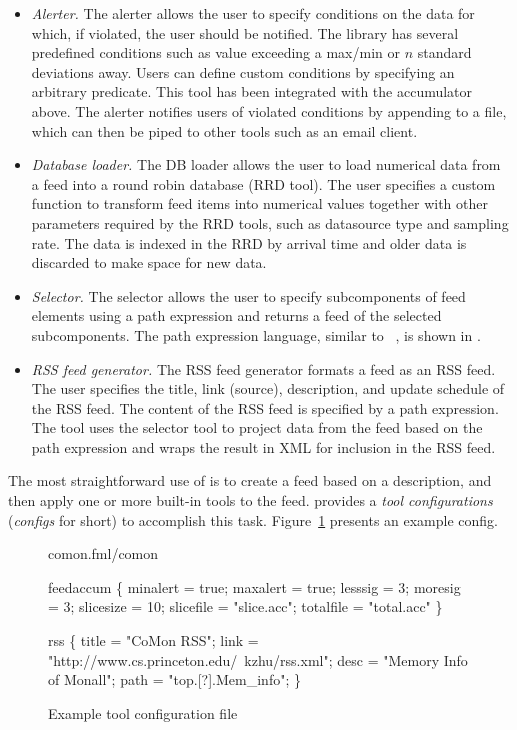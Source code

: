 \begin{itemize}
\item {\em Alerter.} The alerter allows the user to specify conditions on the data for which, if violated, the user should be notified. The library has several predefined conditions such as value exceeding a max/min or  $n$ standard deviations away. 
Users can define custom conditions by specifying an arbitrary \ocaml{} predicate. 
This tool has been integrated with the accumulator above. The alerter notifies users of violated conditions by
appending to a file, which can then be piped to other tools such as an email
client.

\item {\em Database loader.} The DB loader allows the user to load numerical
data from a feed into a round robin database (RRD tool). The user specifies
a custom function to transform feed items into numerical values together with other parameters required by the RRD tools, such as datasource
type and sampling rate. The data is indexed in the RRD by arrival time and
older data is discarded to make space for new data.

\item {\em Selector.} The selector allows the user to specify subcomponents of feed elements using a path expression and returns a feed of the selected subcomponents. The path expression language, similar to \xpath{}~\cite{xpath}, is shown in .

\item {\em RSS feed generator.} The RSS feed generator formats a
\padsd{} feed as an RSS feed. The user specifies
the title, link (source), description, and update schedule of the RSS feed.
The content of the RSS feed is specified by a path expression. The tool uses the selector tool to
project data from the feed based on the path expression and wraps the result in XML for inclusion in the RSS feed.
\end{itemize}

The most straightforward use of \padsd{} is to create a feed 
based on a \padsd{} description, and then apply one or more built-in tools 
to the feed. \padsd{} provides a {\it tool configurations} ({\it configs} for short) to accomplish this task. 
Figure~\ref{fig:toolconfigs} presents an example config.

\begin{figure}[tb]
\centering
\begin{codebox}
 comon.fml/comon

 feedaccum
\{
  minalert  = true;
  maxalert  = true;
  lesssig   = 3;
  moresig   = 3;
  slicesize = 10;
  slicefile = "slice.acc";
  totalfile = "total.acc"
\}

 rss
\{
  title = "CoMon RSS";
  link  = "http://www.cs.princeton.edu/~kzhu/rss.xml";
  desc  = "Memory Info of Monall";
  path  = "top.[?].Mem_info";
\}
\end{codebox}
\caption{Example tool configuration file}
\label{fig:toolconfigs}
\end{figure}

